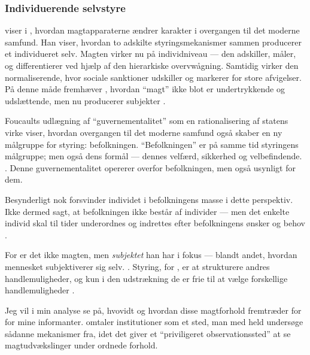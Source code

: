 \subsubsection{Individuerende selvstyre}
\citeauthor{foucaultOvervagningOgStraf2005} viser i , hvordan magtapparaterne ændrer karakter i overgangen til det moderne samfund.
Han viser, hvordan to adskilte styringsmekanismer sammen producerer et individueret selv.
Magten virker nu på individniveau — den adskiller, måler, og differentierer ved hjælp af den hierarkiske overvwågning.
Samtidig virker den normaliserende, hvor sociale sanktioner udskiller og markerer for store afvigelser.
På denne måde fremhæver \citeauthor{foucaultOvervagningOgStraf2005}, hvordan “magt” ikke blot er undertrykkende og udslættende, men nu producerer subjekter \autocite[s. ??]{foucaultOvervagningOgStraf2005}.

Foucaults udlægning af “guvernementalitet” som en rationalisering af statens virke viser, hvordan overgangen til det moderne samfund også skaber en ny målgruppe for styring: befolkningen.
“Befolkningen” er på samme tid styringens målgruppe; men også dens formål — dennes velfærd, sikkerhed og velbefindende. \autocite[s 216ff]{foucaultGovernmentality2000}.
Denne guvernementalitet opererer overfor befolkningen, men også usynligt for dem.

Besynderligt nok forsvinder individet i befolkningens masse i dette perspektiv.
Ikke dermed sagt, at befolkningen ikke består af individer — men det enkelte individ skal til tider underordnes og indrettes efter befolkningens ønsker og behov .

For \citeauthor{foucaultSubjectPower1982} er det ikke magten, men \textit{subjektet} han har i fokus — blandt andet, hvordan mennesket subjektiverer sig selv. \autocite[s. 777f]{foucaultSubjectPower1982}. 
Styring, for \citeauthor{foucaultSubjectPower1982}, er at strukturere andres handlemuligheder, og kun i den udstrækning de er frie til at vælge forskellige handlemuligheder \autocite[s. 790]{foucaultSubjectPower1982}.  

Jeg vil i min analyse se på, hvovidt og hvordan disse magtforhold fremtræder for for mine informanter.
\citeauthor{foucaultSubjectPower1982} omtaler institutioner som et sted, man med held undersøge sådanne mekanismer fra, idet det giver et “priviligeret observationssted” at se magtudvækslinger under ordnede forhold. 


